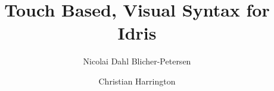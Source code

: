 \documentclass[oribibl]{llncs}
\begin{document}
\mainmatter{}
\title{Touch Based, Visual Syntax for Idris}
\author{Nicolai Dahl Blicher-Petersen \and Christian Harrington \\
}

\maketitle

\begin{abstract}

\end{abstract}









\newpage

\end{document}
